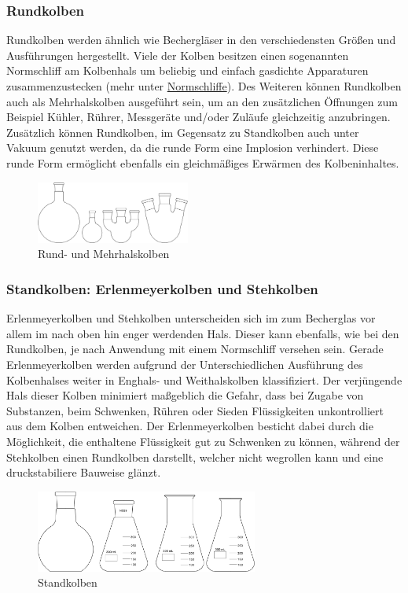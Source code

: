 \subsubsection{Rundkolben}
Rundkolben werden ähnlich wie Bechergläser in den verschiedensten Größen und Ausführungen hergestellt. Viele der Kolben besitzen einen sogenannten Normschliff am Kolbenhals um beliebig und einfach gasdichte Apparaturen zusammenzustecken (mehr unter \hyperlink{Normschliff}{Normschliffe}). Des Weiteren können Rundkolben auch als Mehrhalskolben ausgeführt sein, um an den zusätzlichen Öffnungen zum Beispiel Kühler, Rührer, Messgeräte und/oder Zuläufe gleichzeitig anzubringen. Zusätzlich können Rundkolben, im Gegensatz zu Standkolben auch unter Vakuum genutzt werden, da die runde Form eine Implosion verhindert. Diese runde Form ermöglicht ebenfalls ein gleichmäßiges Erwärmen des Kolbeninhaltes.
\begin{figure}[h!]
	\centering
	\includegraphics[width=0.45\textwidth]{img/rundkolben}
	\caption{Rund- und Mehrhalskolben}
	\label{fig:rundkolben}
\end{figure}
\FloatBarrier

\subsubsection{Standkolben: Erlenmeyerkolben und Stehkolben}
Erlenmeyerkolben und Stehkolben unterscheiden sich im zum Becherglas vor allem im nach oben hin enger werdenden Hals. Dieser kann ebenfalls, wie bei den Rundkolben, je nach Anwendung mit einem Normschliff versehen sein. Gerade Erlenmeyerkolben werden aufgrund der Unterschiedlichen Ausführung des Kolbenhalses weiter in Enghals- und Weithalskolben klassifiziert. Der verjüngende Hals dieser Kolben minimiert maßgeblich die Gefahr, dass bei Zugabe von Substanzen, beim Schwenken, Rühren oder Sieden Flüssigkeiten unkontrolliert aus dem Kolben entweichen. 
Der Erlenmeyerkolben besticht dabei durch die Möglichkeit, die enthaltene Flüssigkeit gut zu Schwenken zu können, während der Stehkolben einen Rundkolben darstellt, welcher nicht wegrollen kann und eine druckstabiliere Bauweise glänzt.

\begin{figure}[h!]
	\centering
	\includegraphics[width=0.65\textwidth]{img/standkolben}
	\caption{Standkolben}
	\label{fig:standkolben}
\end{figure}
\FloatBarrier

